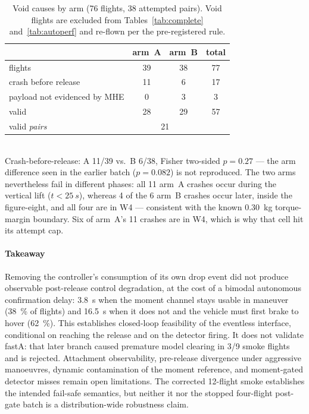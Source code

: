 \begin{table}[t]
\caption{Void causes by arm (76 flights, 38 attempted pairs). Void flights are excluded from
Tables~\ref{tab:complete} and~\ref{tab:autoperf} and re-flown per the pre-registered rule.}
\label{tab:void}
\centering
\begin{tabular}{@{}lccc@{}}
\toprule
 & arm~A & arm~B & total \\
\midrule
flights                       & 39 & 38 & 77 \\
crash before release          & 11 &  6 & 17 \\
payload not evidenced by MHE  &  0 &  3 &  3 \\
\midrule
valid                         & 28 & 29 & 57 \\
valid \emph{pairs}            & \multicolumn{2}{c}{21} & \\
\bottomrule
\end{tabular}
\\[2pt]
\footnotesize Crash-before-release: A 11/39 vs.\ B 6/38, Fisher two-sided $p=\num{0.27}$ ---
the arm difference seen in the earlier batch ($p=\num{0.082}$) is not reproduced. The two arms
nevertheless fail in different phases: all 11 arm~A crashes occur during the vertical lift
($t<\SI{25}{s}$), whereas 4 of the 6 arm~B crashes occur later, inside the figure-eight, and
all four are in W4 --- consistent with the known \SI{0.30}{kg} torque-margin boundary. Six of
arm~A's 11 crashes are in W4, which is why that cell hit its attempt cap.
\end{table}

\paragraph{Takeaway} Removing the controller's consumption of its own drop event did not
produce observable post-release control degradation, at the cost of a
bimodal autonomous confirmation delay: \SI{3.8}{s} when the moment channel stays usable
in maneuver (\SI{38}{\percent} of flights) and \SI{16.5}{s} when it does not and the vehicle
must first brake to hover (\SI{62}{\percent}). This establishes
closed-loop feasibility of the eventless interface, conditional on reaching the release and on
the detector firing. It does not validate fastA: that later branch caused premature model
clearing in 3/9 smoke flights and is rejected. Attachment observability, pre-release divergence
under aggressive manoeuvres, dynamic contamination of the moment reference, and moment-gated
detector misses remain open limitations. The corrected 12-flight smoke establishes the intended
fail-safe semantics, but neither it nor the stopped four-flight post-gate batch is a
distribution-wide robustness claim.
